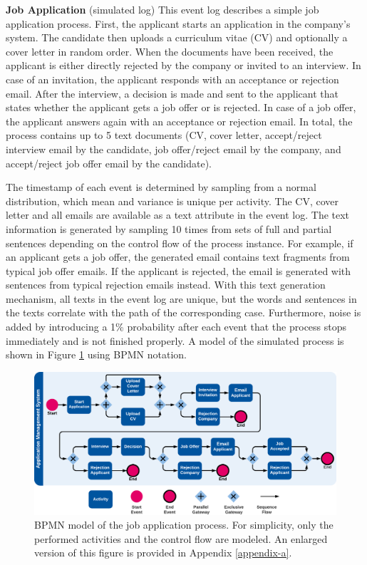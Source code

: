 \textbf{Job Application} (simulated log) This event log describes a simple job application process. 
First, the applicant starts an application in the company’s system.
The candidate then uploads a curriculum vitae (CV) and optionally a cover letter in random order.
When the documents have been received, the applicant is either directly rejected by the company or invited to an interview.
In case of an invitation, the applicant responds with an acceptance or rejection email.
After the interview, a decision is made and sent to the applicant that states whether the applicant gets a job offer or is rejected.
In case of a job offer, the applicant answers again with an acceptance or rejection email.
In total, the process contains up to 5 text documents (CV, cover letter, accept/reject interview email by the candidate, job offer/reject email by the company, and accept/reject job offer email by the candidate).

The timestamp of each event is determined by sampling from a normal distribution, which mean and variance is unique per activity.
The CV, cover letter and all emails are available as a text attribute in the event log.
The text information is generated by sampling 10 times from sets of full and partial sentences depending on the control flow of the process instance.
For example, if an applicant gets a job offer, the generated email contains text fragments from typical job offer emails.
If the applicant is rejected, the email is generated with sentences from typical rejection emails instead.
With this text generation mechanism, all texts in the event log are unique, but the words and sentences in the texts correlate with the path of the corresponding case.
Furthermore, noise is added by introducing a 1\% probability after each event that the process stops immediately and is not finished properly.
A model of the simulated process is shown in Figure \ref{fig:/application-process} using BPMN \cite{BPMN} notation.

\begin{figure}[htbp!]
	\centering
	\includegraphics[width=\textwidth]{figures/application-process}
	\caption[BPMN model of the job application process]{BPMN model of the job application process. For simplicity, only the performed activities and the control flow are modeled. An enlarged version of this figure is provided in Appendix \ref{appendix-a}.}
	\label{fig:/application-process}
\end{figure}

